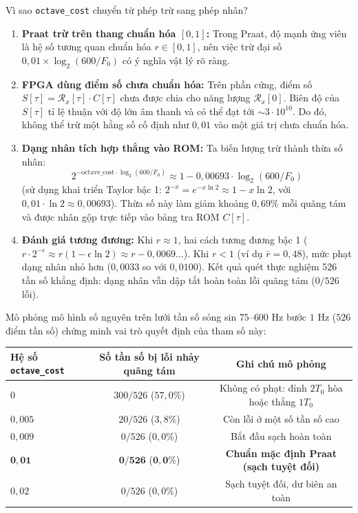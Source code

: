 \documentclass[11pt,a4paper]{article}
\begin{document}
\begin{thoughtqa}{Vì sao \texttt{octave\_cost} chuyển từ phép trừ sang phép nhân?}
\begin{enumerate}
    \setlength{\itemsep}{1pt}
    \item \textbf{Praat trừ trên thang chuẩn hóa $[0, 1]$:} Trong Praat, độ mạnh ứng viên là hệ số tương quan chuẩn hóa $r \in [0, 1]$, nên việc trừ đại số $0{,}01 \times \log_2(600/F_0)$ có ý nghĩa vật lý rõ ràng.
    \item \textbf{FPGA dùng điểm số chưa chuẩn hóa:} Trên phần cứng, điểm số $S[\tau] = \mathcal{R}_x[\tau] \cdot C[\tau]$ chưa được chia cho năng lượng $\mathcal{R}_x[0]$. Biên độ của $S[\tau]$ tỉ lệ thuận với độ lớn âm thanh và có thể đạt tới $\sim 3 \cdot 10^{10}$. Do đó, không thể trừ một hằng số cố định như $0{,}01$ vào một giá trị chưa chuẩn hóa.
    \item \textbf{Dạng nhân tích hợp thẳng vào ROM:} Ta biến lượng trừ thành thừa số nhân:
    \[
    2^{-\text{octave\_cost} \cdot \log_2(600/F_0)} \approx 1 - 0{,}00693 \cdot \log_2(600/F_0)
    \]
    (sử dụng khai triển Taylor bậc 1: $2^{-x} = e^{-x \ln 2} \approx 1 - x \ln 2$, với $0{,}01 \cdot \ln 2 \approx 0{,}00693$). Thừa số này làm giảm khoảng $0{,}69\%$ mỗi quãng tám và được nhân gộp trực tiếp vào bảng tra ROM $C[\tau]$.
    \item \textbf{Đánh giá tương đương:} Khi $r \approx 1$, hai cách tương đương bậc 1 ($r \cdot 2^{-\epsilon} \approx r(1 - \epsilon \ln 2) \approx r - 0{,}0069\dots$). Khi $r < 1$ (ví dụ $\bar{r} = 0{,}48$), mức phạt dạng nhân nhỏ hơn ($0{,}0033$ so với $0{,}0100$). Kết quả quét thực nghiệm 526 tần số khẳng định: dạng nhân vẫn dập tắt hoàn toàn lỗi quãng tám ($0/526$ lỗi).
\end{enumerate}
\end{thoughtqa}

Mô phỏng mô hình số nguyên trên lưới tần số sóng sin $75\text{--}600\text{ Hz}$ bước $1\text{ Hz}$ ($526$ điểm tần số) chứng minh vai trò quyết định của tham số này:

\begin{center}
\small
\begin{tabular}{@{}lcc@{}}
\toprule
Hệ số \texttt{octave\_cost} & Số tần số bị lỗi nhảy quãng tám & Ghi chú mô phỏng \\ \midrule
$0$ & $300 / 526$ ($57{,}0\%$) & Không có phạt: đỉnh $2T_0$ hòa hoặc thắng $1T_0$ \\
$0{,}005$ & $20 / 526$ ($3{,}8\%$) & Còn lỗi ở một số tần số cao \\
$0{,}009$ & $0 / 526$ ($0{,}0\%$) & Bắt đầu sạch hoàn toàn \\
$\mathbf{0{,}01}$ & $\mathbf{0 / 526}$ ($\mathbf{0{,}0\%}$) & \textbf{Chuẩn mặc định Praat (sạch tuyệt đối)} \\
$0{,}02$ & $0 / 526$ ($0{,}0\%$) & Sạch tuyệt đối, dư biên an toàn \\ \bottomrule
\end{tabular}
\end{center}
\end{document}
